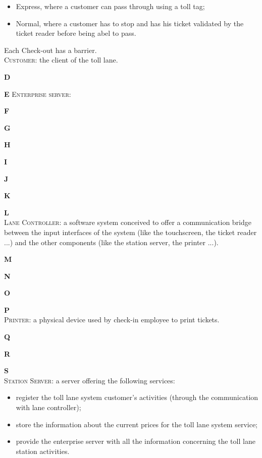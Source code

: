 \begin{list}{}
\begin{itemize}
\item Express, where a customer can pass through using a toll tag;
\item Normal, where a customer has to stop and has his ticket validated by the ticket reader before being abel to pass.
\end{itemize}
Each Check-out has a barrier.\\
\textsc{Customer}: the client of the toll lane.\\
\item \textbf{D}
\item \textbf{E}
\textsc{Enterprise server}:\\
\item \textbf{F}
\item \textbf{G}
\item \textbf{H}
\item \textbf{I}
\item \textbf{J}
\item \textbf{K}
\item \textbf{L}\\
\textsc{Lane Controller}: a software system conceived to offer a communication bridge between the input interfaces of the system (like the touchscreen, the ticket reader ...) and the other components (like the station server, the printer ...).\\
\item \textbf{M}
\item \textbf{N}
\item \textbf{O}
\item \textbf{P}\\
\textsc{Printer}: a physical device used by check-in employee to print tickets.\\
\item \textbf{Q}
\item \textbf{R}
\item \textbf{S}\\
\textsc{Station Server}: a server offering the following services:
\begin{itemize}
\item register the toll lane system customer's activities (through the communication with lane controller);
\item store the information about the current prices for the toll lane system service;
\item provide the enterprise server with all the information concerning the toll lane station activities.
\end{itemize}

\end{list}
